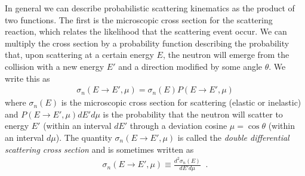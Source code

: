 \documentclass[11pt]{article}
\begin{document}
In general we can describe probabilistic scattering kinematics as the product of two functions.  The first is the microscopic cross section for the scattering reaction, which relates the likelihood that the scattering event occur.  We can multiply the cross section by a probability function describing the probability that, upon scattering at a certain energy \(E\), the neutron will emerge from the collision with a new energy \(E'\) and a direction modified by some angle \(\theta\).  We write this as
\begin{align}
  \sigma_n(E \rightarrow E', \mu) = \sigma_n(E)P(E \rightarrow E', \mu)
\end{align}
where \(\sigma_n(E)\) is the microscopic cross section for scattering (elastic or inelastic) and \(P(E \rightarrow E', \mu)dE'd\mu\) is the probability that the neutron will scatter to energy \(E'\) (within an interval \(dE'\) through a deviation cosine \(\mu = \cos\theta\) (within an interval \(d\mu\)).  The quantity \(\sigma_n(E \rightarrow E', \mu)\) is called the \emph{double differential scattering cross section} and is sometimes written as
\begin{align}
  \sigma_n(E \rightarrow E', \mu) \equiv \frac{d^2\sigma_n(E)}{dE'd\mu} \;\;.
\end{align}
\end{document}
